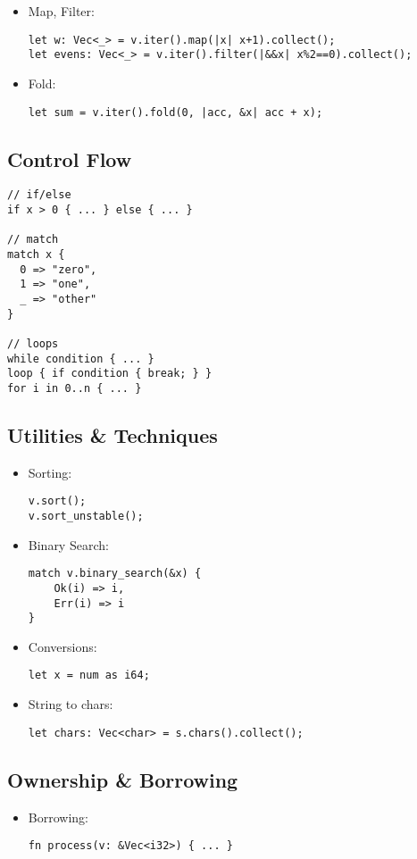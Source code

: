 \documentclass[letterpaper,landscape]{article}
\begin{document}
\begin{multicols*}{3}
\begin{itemize}
\item Map, Filter:
\begin{verbatim}
let w: Vec<_> = v.iter().map(|x| x+1).collect();
let evens: Vec<_> = v.iter().filter(|&&x| x%2==0).collect();
\end{verbatim}

\item Fold:
\begin{verbatim}
let sum = v.iter().fold(0, |acc, &x| acc + x);
\end{verbatim}
\end{itemize}

\subsection*{Control Flow}
\begin{verbatim}
// if/else
if x > 0 { ... } else { ... }

// match
match x {
  0 => "zero",
  1 => "one",
  _ => "other"
}

// loops
while condition { ... }
loop { if condition { break; } }
for i in 0..n { ... }
\end{verbatim}

\subsection*{Utilities \& Techniques}
\begin{itemize}
\item Sorting:
\begin{verbatim}
v.sort();
v.sort_unstable();
\end{verbatim}

\item Binary Search:
\begin{verbatim}
match v.binary_search(&x) {
    Ok(i) => i,
    Err(i) => i
}
\end{verbatim}

\item Conversions:
\begin{verbatim}
let x = num as i64;
\end{verbatim}

\item String to chars:
\begin{verbatim}
let chars: Vec<char> = s.chars().collect();
\end{verbatim}
\end{itemize}


\subsection*{Ownership \& Borrowing}
\begin{itemize}
\item Borrowing:
\begin{verbatim}
fn process(v: &Vec<i32>) { ... }
\end{verbatim}


\end{itemize}
\end{multicols*}
\end{document}
